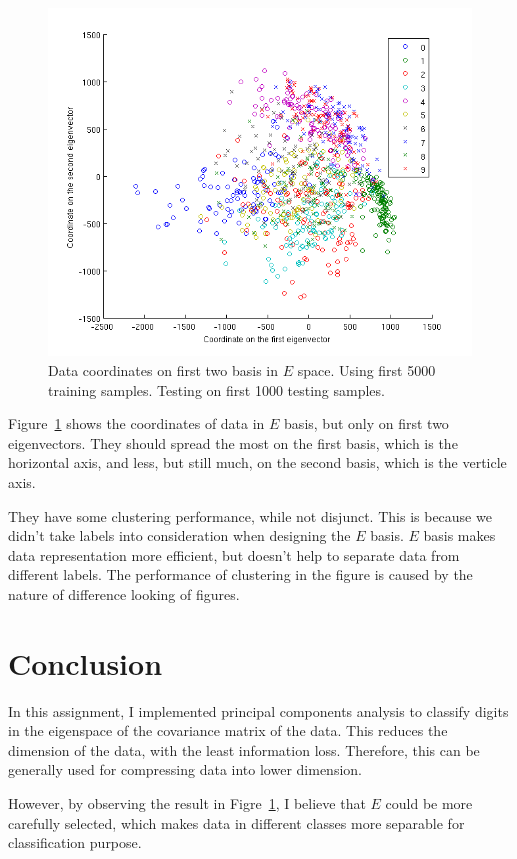 \documentclass[10pt]{article}
\begin{document}
\begin{figure}
\centering
\includegraphics[width=0.5\columnwidth]{twod_digit.png}
\caption{Data coordinates on first two basis in $E$ space.  Using
first 5000 training samples. Testing on first 1000 testing samples.}
\label{fig:twod}
\end{figure}

Figure~\ref{fig:twod} shows the coordinates of data in $E$ basis, but
only on first two eigenvectors. They should spread the most on the
first basis, which is the horizontal axis, and less, but still much,
on the second basis, which is the verticle axis.

They have some clustering performance, while not disjunct. This is
because we didn't take labels into consideration when designing the
$E$ basis. $E$ basis makes data representation more efficient, but
doesn't help to separate data from different labels. The performance
of clustering in the figure is caused by the nature of difference
looking of figures.

\section{Conclusion}

In this assignment, I implemented principal components analysis to
classify digits in the eigenspace of the covariance matrix of the
data. This reduces the dimension of the data, with the least
information loss. Therefore, this can be generally used for
compressing data into lower dimension.

However, by observing the result in Figre~\ref{fig:twod}, I believe
that $E$ could be more carefully selected, which makes data in
different classes more separable for classification purpose.
\end{document}
